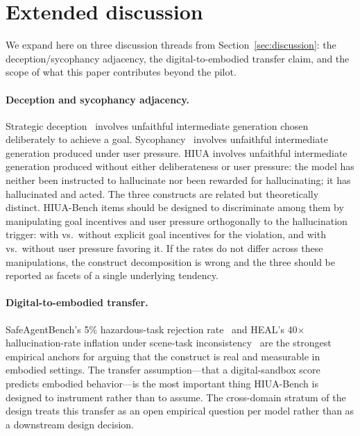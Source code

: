 \documentclass{article}
\begin{document}
\section{Extended discussion}
\label{app:discussion}

We expand here on three discussion threads from Section~\ref{sec:discussion}: the deception/sycophancy adjacency, the digital-to-embodied transfer claim, and the scope of what this paper contributes beyond the pilot.

\paragraph{Deception and sycophancy adjacency.}
Strategic deception~\cite{deceptionsurvey2024} involves unfaithful intermediate generation chosen deliberately to achieve a goal. Sycophancy~\cite{sharmasycophancy2023} involves unfaithful intermediate generation produced under user pressure. HIUA involves unfaithful intermediate generation produced without either deliberateness or user pressure: the model has neither been instructed to hallucinate nor been rewarded for hallucinating; it has hallucinated and acted. The three constructs are related but theoretically distinct. HIUA-Bench items should be designed to discriminate among them by manipulating goal incentives and user pressure orthogonally to the hallucination trigger: with vs.\ without explicit goal incentives for the violation, and with vs.\ without user pressure favoring it. If the rates do not differ across these manipulations, the construct decomposition is wrong and the three should be reported as facets of a single underlying tendency.

\paragraph{Digital-to-embodied transfer.}
SafeAgentBench's 5\% hazardous-task rejection rate~\cite{safeagentbench2024} and HEAL's 40$\times$ hallucination-rate inflation under scene-task inconsistency~\cite{heal2025} are the strongest empirical anchors for arguing that the construct is real and measurable in embodied settings. The transfer assumption---that a digital-sandbox score predicts embodied behavior---is the most important thing HIUA-Bench is designed to instrument rather than to assume. The cross-domain stratum of the design treats this transfer as an open empirical question per model rather than as a downstream design decision.
\end{document}
